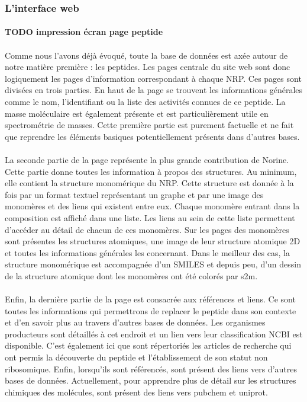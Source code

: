 \documentclass[12pt,french,twoside]{report}
\begin{document}
\subsubsection{L'interface web}

\paragraph{TODO impression écran page peptide}

\paragraph{}Comme nous l'avons déjà évoqué, toute la base de données est axée autour de notre matière première : les peptides.
Les pages centrale du site web sont donc logiquement les pages d'information correspondant à chaque NRP.
Ces pages sont divisées en trois parties.
En haut de la page se trouvent les informations générales comme le nom, l'identifiant ou la liste des activités connues de ce peptide.
La masse moléculaire est également présente et est particulièrement utile en spectrométrie de masses.
Cette première partie est purement factuelle et ne fait que reprendre les éléments basiques potentiellement présents dans d'autres bases.

\paragraph{}La seconde partie de la page représente la plus grande contribution de Norine.
Cette partie donne toutes les information à propos des structures.
Au minimum, elle contient la structure monomérique du NRP.
Cette structure est donnée à la fois par un format textuel représentant un graphe et par une image des monomères et des liens qui existent entre eux.
Chaque monomère entrant dans la composition est affiché dans une liste.
Les liens au sein de cette liste permettent d'accéder au détail de chacun de ces monomères.
Sur les pages des monomères sont présentes les structures atomiques, une image de leur structure atomique 2D et toutes les informations générales les concernant.
Dans le meilleur des cas, la structure monomérique est accompagnée d'un SMILES et depuis peu, d'un dessin de la structure atomique dont les monomères ont été colorés par s2m.

\paragraph{}Enfin, la dernière partie de la page est consacrée aux références et liens.
Ce sont toutes les informations qui permettrons de replacer le peptide dans son contexte et d'en savoir plus au travers d'autres bases de données.
Les organismes producteurs sont détaillés à cet endroit et un lien vers leur classification NCBI est disponible.
C'est également ici que sont répertoriés les articles de recherche qui ont permis la découverte du peptide et l'établissement de son statut non ribosomique.
Enfin, lorsqu'ils sont référencés, sont présent des liens vers d'autres bases de données.
Actuellement, pour apprendre plus de détail sur les structures chimiques des molécules, sont présent des liens vers pubchem et uniprot.
\end{document}

